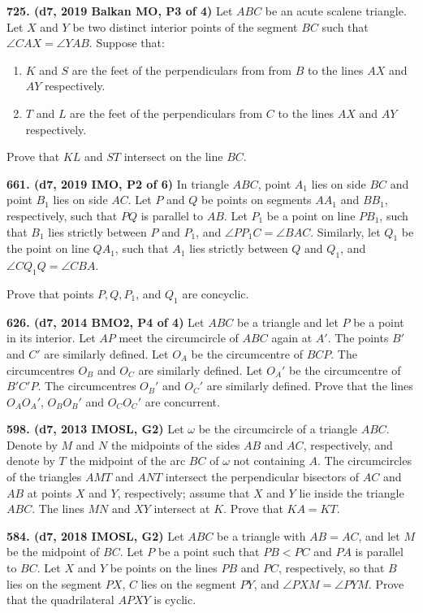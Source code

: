 \documentclass{article}
\begin{document}
\textbf{725. (\color{red}d7\color{black}, 2019 Balkan MO, P3 of 4)} Let $ABC$ be an acute scalene triangle. Let $X$ and $Y$ be two distinct interior points of the segment $BC$ such that $\angle{CAX} = \angle{YAB}$. Suppose that:
\begin{enumerate}
    \item $K$ and $S$ are the feet of the perpendiculars from from $B$ to the lines $AX$ and $AY$ respectively.
    \item $T$ and $L$ are the feet of the perpendiculars from $C$ to the lines $AX$ and $AY$ respectively.
\end{enumerate}
Prove that $KL$ and $ST$ intersect on the line $BC$.

\textbf{661. (\color{red}d7\color{black}, 2019 IMO, P2 of 6)}
In triangle $ABC$, point $A_1$ lies on side $BC$ and point $B_1$ lies on side $AC$. Let $P$ and $Q$ be points on segments $AA_1$ and $BB_1$, respectively, such that $PQ$ is parallel to $AB$. Let $P_1$ be a point on line $PB_1$, such that $B_1$ lies strictly between $P$ and $P_1$, and $\angle PP_1C=\angle BAC$. Similarly, let $Q_1$ be the point on line $QA_1$, such that $A_1$ lies strictly between $Q$ and $Q_1$, and $\angle CQ_1Q=\angle CBA$.

Prove that points $P,Q,P_1$, and $Q_1$ are concyclic.

\textbf{626. (\color{red}d7\color{black}, 2014 BMO2, P4 of 4)} Let $ABC$ be a triangle and let $P$ be a point in its interior. Let $AP$ meet the circumcircle of $ABC$ again at $A'$. The points $B'$ and $C'$ are similarly defined. Let $O_A$ be the circumcentre of $BCP$. The circumcentres $O_B$ and $O_C$ are similarly defined. Let ${O_A}'$ be the circumcentre of $B'C'P$. The circumcentres ${O_B}'$ and ${O_C}'$ are similarly defined. Prove that the lines $O_A{O_A}'$, $O_B{O_B}'$ and $O_C{O_C}'$ are concurrent.

\textbf{598. (\color{red}d7\color{black}, 2013 IMOSL, G2)} Let $\omega$ be the circumcircle of a triangle $ABC$. Denote by $M$ and $N$ the midpoints of the sides $AB$ and $AC$, respectively, and denote by $T$ the midpoint of the arc $BC$ of $\omega$ not containing $A$. The circumcircles of the triangles $AMT$ and $ANT$ intersect the perpendicular bisectors of $AC$ and $AB$ at points $X$ and $Y$, respectively; assume that $X$ and $Y$ lie inside the triangle $ABC$. The lines $MN$ and $XY$ intersect at $K$. Prove that $KA=KT$.

\textbf{584. (\color{red}d7\color{black}, 2018 IMOSL, G2)} Let $ABC$ be a triangle with $AB=AC$, and let $M$ be the midpoint of $BC$. Let $P$ be a point such that $PB<PC$ and $PA$ is parallel to $BC$. Let $X$ and $Y$ be points on the lines $PB$ and $PC$, respectively, so that $B$ lies on the segment $PX$, $C$ lies on the segment $PY$, and $\angle PXM=\angle PYM$. Prove that the quadrilateral $APXY$ is cyclic.
\end{document}

